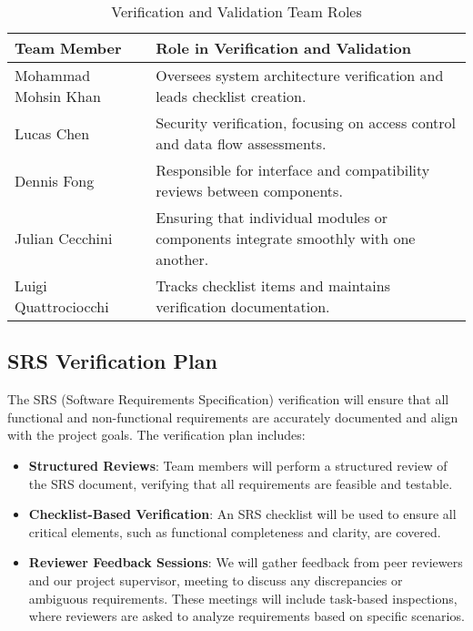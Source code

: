 \documentclass[12pt, titlepage]{article}
\begin{document}
\begin{table}[h!]
  \centering
  \begin{tabular}{|p{5cm}|p{10cm}|}
      \hline
      \textbf{Team Member} & \textbf{Role in Verification and Validation} \\
      \hline
      Mohammad Mohsin Khan & Oversees system architecture verification and leads checklist creation. \\
      \hline
      Lucas Chen & Security verification, focusing on access control and data flow assessments. \\
      \hline
      Dennis Fong & Responsible for interface and compatibility reviews between components. \\
      \hline
      Julian Cecchini & Ensuring that individual modules or components integrate smoothly with one another. \\
      \hline
      Luigi Quattrociocchi & Tracks checklist items and maintains verification documentation. \\
      \hline
  \end{tabular}
  \caption{Verification and Validation Team Roles}
  \label{tab:team-roles}
\end{table}


\subsection{SRS Verification Plan}

The SRS (Software Requirements Specification) verification will ensure that all functional and non-functional requirements are accurately documented and align with the project goals. The verification plan includes:

\begin{itemize}
    \item \textbf{Structured Reviews}: Team members will perform a structured review of the SRS document, verifying that all requirements are feasible and testable.
    \item \textbf{Checklist-Based Verification}: An SRS checklist will be used to ensure all critical elements, such as functional completeness and clarity, are covered.
    \item \textbf{Reviewer Feedback Sessions}: We will gather feedback from peer reviewers and our project supervisor, meeting to discuss any discrepancies or ambiguous requirements. These meetings will include task-based inspections, where reviewers are asked to analyze requirements based on specific scenarios.
\end{itemize}
\end{document}
